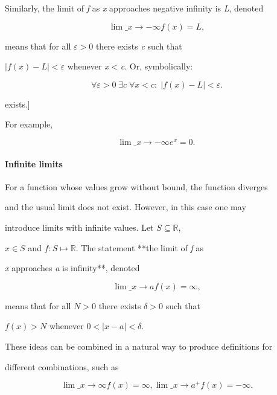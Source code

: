 Similarly, the limit of \textit{f} as \textit{x} approaches negative infinity is \textit{L}, denoted



$$\lim\_{x \to -\infty}f(x) = L,$$



means that for all $\varepsilon > 0$ there exists \textit{c} such that

$|f(x) - L| < \varepsilon$ whenever \textit{x} < \textit{c}. Or, symbolically:



$$\forall \varepsilon > 0 \; \exists c \; \forall x < c :\; |f(x) - L| < \varepsilon.$$




exists.]



For example,



$$\lim\_{x \to -\infty}e^x = 0. \,$$



\paragraph{Infinite limits}



For a function whose values grow without bound, the function diverges

and the usual limit does not exist. However, in this case one may

introduce limits with infinite values. Let $S\subseteq\mathbb{R}$,

$x\in S$ and $f:S\mapsto\mathbb{R}$. The statement **the limit of \textit{f} as

\textit{x} approaches \textit{a} is infinity**, denoted



$$\lim\_{x \to a} f(x) = \infty,$$



means that for all $N > 0$ there exists $\delta > 0$ such that

$f(x) > N$ whenever $0 < |x - a| < \delta.$



These ideas can be combined in a natural way to produce definitions for

different combinations, such as



$$\lim\_{x \to \infty} f(x) = \infty, \lim\_{x \to a^+}f(x) = -\infty.$$



